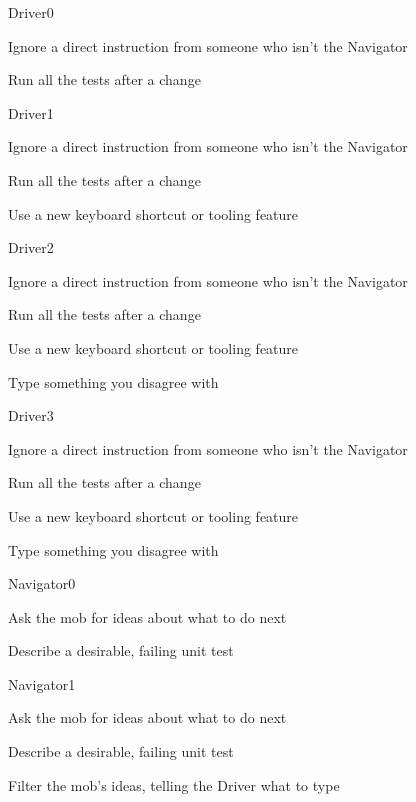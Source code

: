 \documentclass[20pt]{extarticle}
\begin{document}
\begin{role}{Driver}{0}
  \item Ignore a direct instruction from someone who isn't the Navigator
  \item Run all the tests after a change
\end{role}

\begin{role}{Driver}{1}
  \item Ignore a direct instruction from someone who isn't the Navigator
  \item Run all the tests after a change
  \item Use a new keyboard shortcut or tooling feature
\end{role}

\begin{role}{Driver}{2}
  \item Ignore a direct instruction from someone who isn't the Navigator
  \item Run all the tests after a change
  \item Use a new keyboard shortcut or tooling feature
  \item Type something you disagree with
\end{role}

\begin{role}{Driver}{3}
  \item Ignore a direct instruction from someone who isn't the Navigator
  \item Run all the tests after a change
  \item Use a new keyboard shortcut or tooling feature
  \item Type something you disagree with
\end{role}


\begin{role}{Navigator}{0}
  \item Ask the mob for ideas about what to do next
  \item Describe a desirable, failing unit test
\end{role}

\begin{role}{Navigator}{1}
  \item Ask the mob for ideas about what to do next
  \item Describe a desirable, failing unit test
  \item Filter the mob's ideas, telling the Driver what to type
\end{role}
\end{document}

